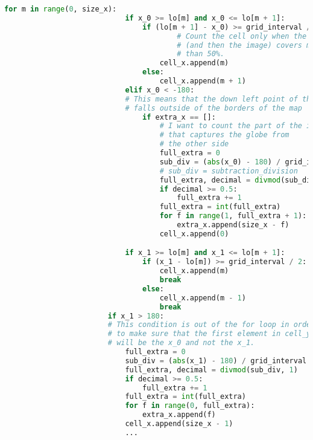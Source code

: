 \documentclass[12pt,a4paper,notitlepage,oneside,openright]{report}
\begin{document}
\begin{center}
\begin{lstlisting}[language=Python, formfeed=\newpage, extendedchars=true]
                        for m in range(0, size_x):
                            if x_0 >= lo[m] and x_0 <= lo[m + 1]:
                                if (lo[m + 1] - x_0) >= grid_interval / 2:
                                        # Count the cell only when the point
                                        # (and then the image) covers more
                                        # than 50%.
                                    cell_x.append(m)
                                else:
                                    cell_x.append(m + 1)
                            elif x_0 < -180:
                            # This means that the down left point of the image
                            # falls outside of the borders of the map
                                if extra_x == []:
                                    # I want to count the part of the image
                                    # that captures the globe from
                                    # the other side
                                    full_extra = 0
                                    sub_div = (abs(x_0) - 180) / grid_interval
                                    # sub_div = subtraction_division
                                    full_extra, decimal = divmod(sub_div, 1)
                                    if decimal >= 0.5:
                                        full_extra += 1
                                    full_extra = int(full_extra)
                                    for f in range(1, full_extra + 1):
                                        extra_x.append(size_x - f)
                                    cell_x.append(0)

                            if x_1 >= lo[m] and x_1 <= lo[m + 1]:
                                if (x_1 - lo[m]) >= grid_interval / 2:
                                    cell_x.append(m)
                                    break
                                else:
                                    cell_x.append(m - 1)
                                    break
                        if x_1 > 180:  
                        # This condition is out of the for loop in order
                        # to make sure that the first element in cell_y
                        # will be the x_0 and not the x_1.
                            full_extra = 0
                            sub_div = (abs(x_1) - 180) / grid_interval
                            full_extra, decimal = divmod(sub_div, 1)
                            if decimal >= 0.5:
                                full_extra += 1
                            full_extra = int(full_extra)
                            for f in range(0, full_extra):
                                extra_x.append(f)
                            cell_x.append(size_x - 1)
							...
\end{lstlisting}
\end{center}
\end{document}
